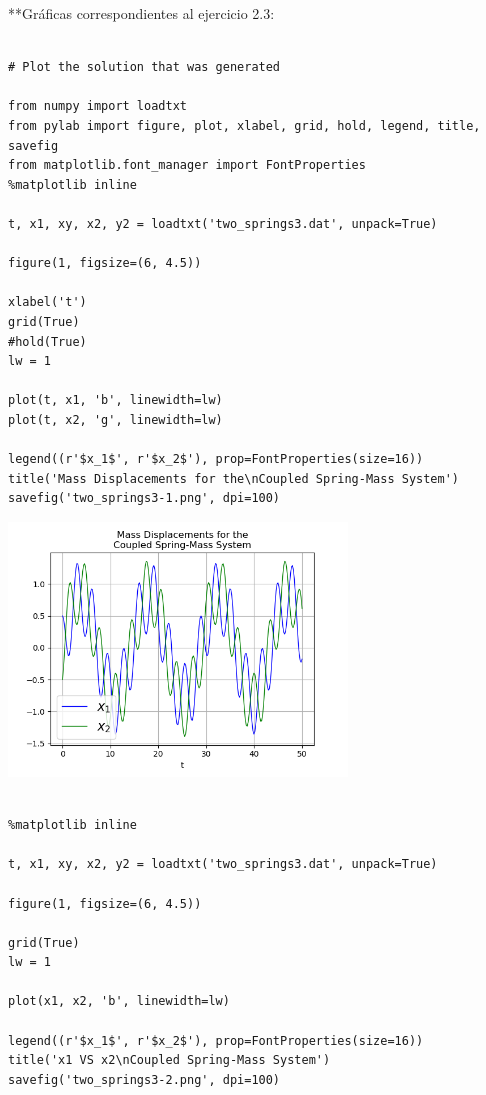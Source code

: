 \documentclass{article} %
\begin{document}
**Gráficas correspondientes al ejercicio 2.3:

\begin{verbatim} 

# Plot the solution that was generated

from numpy import loadtxt
from pylab import figure, plot, xlabel, grid, hold, legend, title, savefig
from matplotlib.font_manager import FontProperties
%matplotlib inline

t, x1, xy, x2, y2 = loadtxt('two_springs3.dat', unpack=True)

figure(1, figsize=(6, 4.5))

xlabel('t')
grid(True)
#hold(True)
lw = 1

plot(t, x1, 'b', linewidth=lw)
plot(t, x2, 'g', linewidth=lw)

legend((r'$x_1$', r'$x_2$'), prop=FontProperties(size=16))
title('Mass Displacements for the\nCoupled Spring-Mass System')
savefig('two_springs3-1.png', dpi=100)

\end{verbatim}



\begin{center}
 	\includegraphics[width=9cm]{two_springs3-1.png}
 \end{center}



\begin{verbatim} 

%matplotlib inline

t, x1, xy, x2, y2 = loadtxt('two_springs3.dat', unpack=True)

figure(1, figsize=(6, 4.5))

grid(True)
lw = 1

plot(x1, x2, 'b', linewidth=lw)

legend((r'$x_1$', r'$x_2$'), prop=FontProperties(size=16))
title('x1 VS x2\nCoupled Spring-Mass System')
savefig('two_springs3-2.png', dpi=100)

\end{verbatim}
\end{document}
